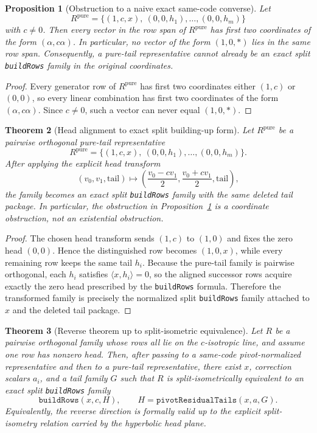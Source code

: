 \documentclass[12pt]{article}
\newtheorem{theorem}{Theorem}[section]
\newtheorem{prop}[theorem]{Proposition}
\newenvironment{blueblock}{\begingroup\color{blue}}{\endgroup}
\begin{document}
\begin{blueblock}
\begin{prop}[Obstruction to a naive exact same-code converse]
\label{prop:pure-tail-obstruction}
Let
\[
R^{\mathrm{pure}}
=
\{(1,c,x),\ (0,0,h_1),\dots,(0,0,h_m)\}
\]
with $c\neq 0$. Then every vector in the row span of $R^{\mathrm{pure}}$ has first two coordinates of the form $(\alpha,c\alpha)$. In particular, no vector of the form $(1,0,*)$ lies in the same row span. Consequently, a pure-tail representative cannot already be an exact split \texttt{buildRows} family in the original coordinates.
\end{prop}

\begin{proof}
Every generator row of $R^{\mathrm{pure}}$ has first two coordinates either $(1,c)$ or $(0,0)$, so every linear combination has first two coordinates of the form $(\alpha,c\alpha)$. Since $c\neq 0$, such a vector can never equal $(1,0,*)$.
\end{proof}

\begin{theorem}[Head alignment to exact split building-up form]
\label{thm:head-alignment-buildrows}
Let $R^{\mathrm{pure}}$ be a pairwise orthogonal pure-tail representative
\[
R^{\mathrm{pure}}
=
\{(1,c,x),\ (0,0,h_1),\dots,(0,0,h_m)\}.
\]
After applying the explicit head transform
\[
(v_0,v_1,\mathrm{tail})\longmapsto
\left(\frac{v_0-cv_1}{2},\frac{v_0+cv_1}{2},\mathrm{tail}\right),
\]
the family becomes an exact split \texttt{buildRows} family with the same deleted tail package. In particular, the obstruction in Proposition~\ref{prop:pure-tail-obstruction} is a coordinate obstruction, not an existential obstruction.
\end{theorem}

\begin{proof}
The chosen head transform sends $(1,c)$ to $(1,0)$ and fixes the zero head $(0,0)$. Hence the distinguished row becomes $(1,0,x)$, while every remaining row keeps the same tail $h_i$. Because the pure-tail family is pairwise orthogonal, each $h_i$ satisfies $\langle x,h_i\rangle=0$, so the aligned successor rows acquire exactly the zero head prescribed by the \texttt{buildRows} formula. Therefore the transformed family is precisely the normalized split \texttt{buildRows} family attached to $x$ and the deleted tail package.
\end{proof}

\begin{theorem}[Reverse theorem up to split-isometric equivalence]
\label{thm:reverse-up-to-split-isometry}
Let $R$ be a pairwise orthogonal family whose rows all lie on the $c$-isotropic line, and assume one row has nonzero head. Then, after passing to a same-code pivot-normalized representative and then to a pure-tail representative, there exist $x$, correction scalars $a_i$, and a tail family $G$ such that $R$ is split-isometrically equivalent to an exact split \texttt{buildRows} family
\[
\texttt{buildRows}(x,c,H),
\qquad
H=\texttt{pivotResidualTails}(x,a,G).
\]
Equivalently, the reverse direction is formally valid up to the explicit split-isometry relation carried by the hyperbolic head plane.
\end{theorem}


\end{blueblock}
\end{document}
